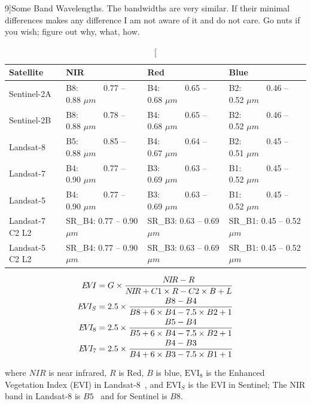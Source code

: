 \begin{table}[]
\centering
\caption[][9\baselineskip]{Some Band Wavelengths. The bandwidths are very similar. If their
minimal differences makes any difference I am not aware of it and do not care. 
Go nuts if you wish; figure out why, what, how.} 
\label{tab:SomeBandWavelengths}
\begin{tabular}{|l|l|l|l|}
\hline
\rowcolor{shadecolor} 
\small{Satellite} & 
\small{NIR} & 
\small{Red}  &
\small{Blue} \\
\hline
Sentinel-2A & B8:~~~~~~0.77 -- 0.88 $\mu m$ & B4:~~~~~~0.65 -- 0.68 $\mu m$ & B2:~~~~~~0.46 -- 0.52 $\mu m$\\ 
\hline
\rowcolor{aliceblue} 
Sentinel-2B & B8:~~~~~~0.78 -- 0.88 $\mu m$ & B4:~~~~~~0.65 -- 0.68 $\mu m$ & B2:~~~~~~0.46 -- 0.52 $\mu m$ \\ 
\hline
Landsat-8 & B5:~~~~~~0.85 -- 0.88 $\mu m$ & B4:~~~~~~0.64 -- 0.67 $\mu m$ & B2:~~~~~~0.45 -- 0.51 $\mu m$\\ 
\hline
\rowcolor{aliceblue} 
Landsat-7 & B4:~~~~~~0.77 -- 0.90 $\mu m$ & B3:~~~~~~0.63 -- 0.69 $\mu m$ & B1:~~~~~~0.45 -- 0.52 $\mu m$\\ 
\hline
Landsat-5 & B4:~~~~~~0.77 -- 0.90 $\mu m$  & B3:~~~~~~0.63 -- 0.69 $\mu m$ & B1:~~~~~~0.45 -- 0.52 $\mu m$\\ 
\hline
\rowcolor{aliceblue} 
Landsat-7 C2 L2 & SR\_B4: 0.77 -- 0.90 $\mu m$ & SR\_B3: 0.63 -- 0.69 $\mu m$ & SR\_B1: 0.45 -- 0.52 $\mu m$\\ 
\hline
Landsat-5 C2 L2 & SR\_B4: 0.77 -- 0.90 $\mu m$ & SR\_B3: 0.63 -- 0.69 $\mu m$ & SR\_B1: 0.45 -- 0.52 $\mu m$\\ 
\hline
\end{tabular}
\end{table}


\begin{gather}
\label{eq:EVILandsat8}
\begin{aligned}
\EVI &= G \times \frac{\NIR - R}{\NIR + C1 \times R - C2 \times B + L} \\
\EVI_S &= 2.5 \times \frac{B8 - B4}{B8 + 6 \times B4 - 7.5 \times B2 + 1}\\
\EVI_8 &= 2.5 \times \frac{B5 - B4}{B5 + 6 \times B4 - 7.5 \times B2 + 1} \\
\EVI_7 &= 2.5 \times \frac{B4 - B3}{B4 + 6 \times B3 - 7.5 \times B1 + 1}
\end{aligned}
\end{gather} 

\noindent where $NIR$ is near infrared, $R$ is Red,
$B$ is blue, 
$\text{EVI}_8$ is the Enhanced Vegetation Index (EVI) 
in Landsat-8~\citep{Landsat8EVI}, 
and $\text{EVI}_S$
is the EVI in Sentinel; The NIR band in
Landsat-8 is $B5$~\citep{L8BandNames}
and for Sentinel is $B8$.


